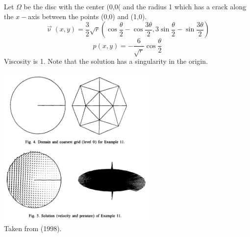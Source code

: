 
Let $\Omega$ be the disc with the center (0,0( and the radius 1 which has a crack
along the $x-$axis between the points (0,0) and (1,0).
\[
\vec\upnu(x,y) = \frac32 \sqrt{r} \left( \cos\frac{\theta}{2} -\cos \frac{3\theta}{2} , 
3\sin\frac{\theta}{2} -\sin \frac{3\theta}{2} \right)
\]
\[
p(x,y)=-\frac{6}{\sqrt{r}} \cos\frac{\theta}{2}
\]
Viscosity is 1. Note that the solution has a singularity 
in the origin.

\begin{center}
\includegraphics[height=8cm]{images/mms/john98}\\
{\captionfont Taken from \textcite{john98} (1998).} 
\end{center}


